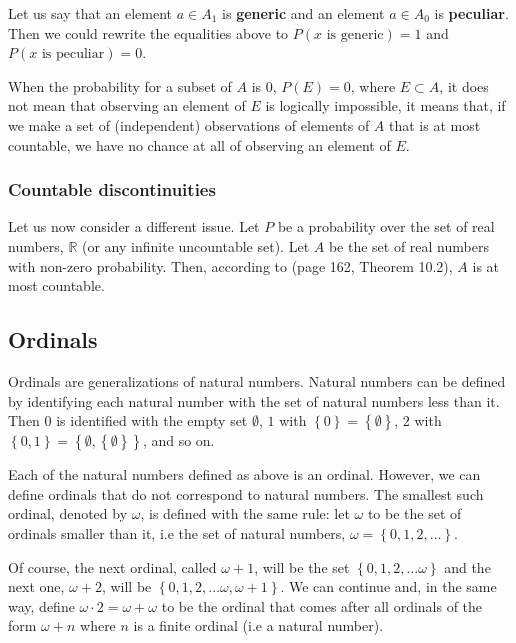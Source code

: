 \documentclass[a4paper
,draft
]{article}
\def\reale{\mathbb{R}}
\newcommand{\multime}[1]{\left\{ #1 \right\}}
\newcommand{\definitie}[1]{\textbf{#1}}
\begin{document}
Let us say that an element $a\in A_1$ is \definitie{generic}
and an element $a\in A_0$ is \definitie{peculiar}. Then we could rewrite
the equalities above to $P(x\mbox{ is generic}) = 1$ and
$P(x\mbox{ is peculiar}) = 0$.

When the probability for a subset of $A$ is $0$, $P(E)=0$, where $E\subset A$,
it does not mean that observing an element of $E$ is logically impossible,
it means that,
if we make a set of (independent) observations of elements of $A$
that is at most countable, we have no chance at all of observing an element of
$E$.

\subsubsection{Countable discontinuities}

Let us now consider a different issue.
Let $P$ be a probability over the set of real numbers, $\reale$ (or
any infinite uncountable set).
Let $A$ be the set of real numbers with non-zero probability.
Then, according to \textcite{Billingsley1995} (page 162, Theorem 10.2),
$A$ is at most countable.

\subsection{Ordinals}
\label{sec:ordinals}

Ordinals are generalizations of natural numbers. Natural numbers can be
defined by identifying each natural number with the set of natural numbers less
than it. Then $0$ is identified with the empty set $\emptyset$,
$1$ with $\multime{0}=\multime{\emptyset}$,
$2$ with $\multime{0, 1}=\multime{\emptyset, \multime{\emptyset}}$,
and so on.

Each of the natural numbers defined as above is an ordinal.
However, we can define ordinals that do not correspond to natural numbers.
The smallest such ordinal, denoted by $\omega$, is defined with the same rule:
let $\omega$ to be the set of ordinals smaller than it, i.e
the set of natural numbers, $\omega=\multime{0, 1, 2, \dots}$.

Of course, the next ordinal, called $\omega + 1$, will be the set
$\multime{0, 1, 2, \dots \omega}$ and the next one,
$\omega+2$, will be $\multime{0, 1, 2, \dots \omega, \omega+1}$. We can
continue and, in the same way, define $\omega\cdot 2=\omega+\omega$ to be
the ordinal that comes after all ordinals of the form $\omega+n$
where $n$ is a finite ordinal (i.e a natural number).
\end{document}
